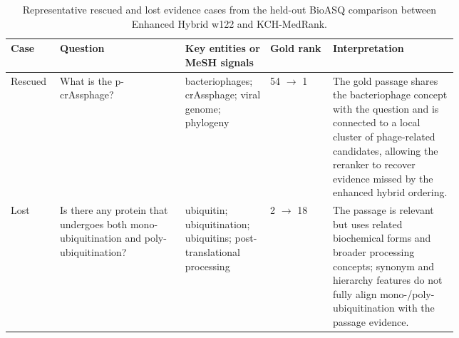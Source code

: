 \begin{table}[t]
\centering
\small
\caption{Representative rescued and lost evidence cases from the held-out BioASQ comparison between Enhanced Hybrid w122 and KCH-MedRank.}
\label{tab:case-study}
\begin{tabularx}{\linewidth}{p{0.11\linewidth}p{0.29\linewidth}p{0.19\linewidth}p{0.14\linewidth}X}
\toprule
Case & Question & Key entities or MeSH signals & Gold rank & Interpretation \\
\midrule
Rescued & What is the p-crAssphage? & bacteriophages; crAssphage; viral genome; phylogeny & 54 $\rightarrow$ 1 & The gold passage shares the bacteriophage concept with the question and is connected to a local cluster of phage-related candidates, allowing the reranker to recover evidence missed by the enhanced hybrid ordering. \\
Lost & Is there any protein that undergoes both mono-ubiquitination and poly-ubiquitination? & ubiquitin; ubiquitination; ubiquitins; post-translational processing & 2 $\rightarrow$ 18 & The passage is relevant but uses related biochemical forms and broader processing concepts; synonym and hierarchy features do not fully align mono-/poly-ubiquitination with the passage evidence. \\
\bottomrule
\end{tabularx}
\end{table}
